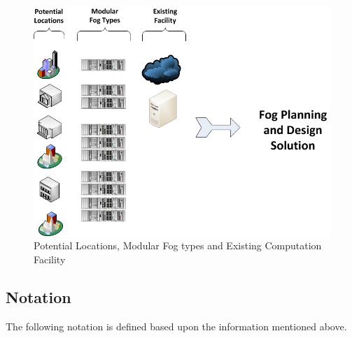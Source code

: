 \documentclass[10pt,journal,compsoc]{IEEEtran}
\begin{document}
\begin{figure}[t]
\centerline{\includegraphics[width=4.5in]{existset.png}}
\caption{Potential Locations, Modular Fog types and Existing Computation Facility} 
\label{exist}
\end{figure}
\fi





\subsection{Notation}

The following notation is defined based upon the information mentioned above.
\end{document}
